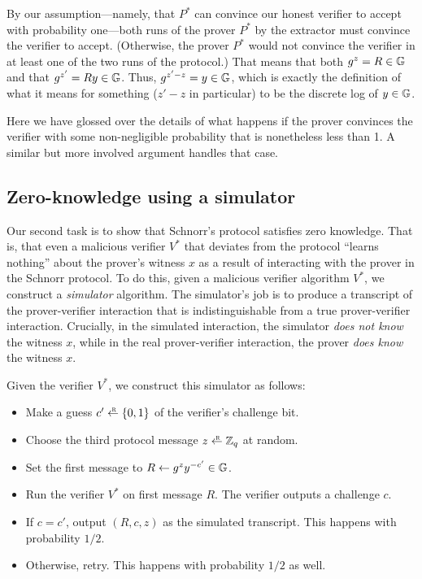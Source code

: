 By our assumption---namely, that $P^*$ can convince our honest verifier
to accept with probability one---both
runs of the prover $P^*$ by the extractor must convince the verifier to accept. (Otherwise,
the prover $P^*$ would not convince the verifier in at least one of the two runs of the protocol.)
That means that both $g^z=R \in \mathbb{G}$ and that $g^{z'}=Ry \in \mathbb{G}$.  Thus, $g^{z'-z}=y \in \mathbb{G}$,
which is exactly the definition of what it means for something ($z'-z$
in particular) to be the discrete log of $y \in \mathbb{G}$.

Here we have glossed over the details of what happens if the prover
convinces the verifier with some non-negligible probability that is
nonetheless less than 1.
A similar but more involved argument handles that case.

\subsection{Zero-knowledge using a simulator}

Our second task is to show that Schnorr's protocol satisfies zero knowledge.
That is, that even a malicious verifier $V^*$ that deviates from
the protocol ``learns nothing'' about the prover's witness
$x$ as a result of interacting with the prover in the Schnorr protocol.
To do this, given a malicious verifier algorithm $V^*$, we construct a \emph{simulator} algorithm.
The simulator's job
is to produce a transcript of the prover-verifier interaction that is
indistinguishable from a true prover-verifier interaction.
Crucially, in the simulated interaction, the simulator \emph{does not know} the witness $x$,
while in the real prover-verifier interaction, the prover \emph{does know} the witness $x$.

Given the verifier $V^*$, 
we construct this simulator as follows:

\begin{itemize}

\item Make a guess $c' \getsr \{0,1\}$ of the verifier's challenge bit.

\item Choose the third protocol message $z \getsr \Z_q$ at random.

\item Set the first message to $R \gets g^z y^{-c'} \in \mathbb{G}$.

\item Run the verifier $V^*$ on first message $R$.
The verifier outputs a challenge $c$.
\item If $c=c'$, output $(R, c, z)$ as the simulated transcript.
This happens with probability $1/2$.

\item Otherwise, retry.  This happens with probability $1/2$ as well.

\end{itemize}

